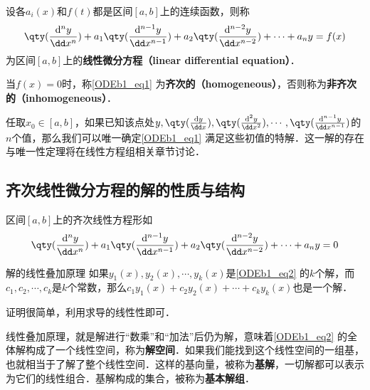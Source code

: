 

\begin{definition}{}
设各$a_i(x)$和$f(t)$都是区间$[a, b]$上的连续函数，则称
\begin{equation}\label{ODEb1_eq1}
\qty(\frac{\mathrm{d}^n y}{\dd x^n})+a_1\qty(\frac{\mathrm{d}^{n-1} y}{\dd x^{n-1}})+a_2\qty(\frac{\mathrm{d}^{n-2} y}{\dd x^{n-2}})+\cdots+a_ny=f(x)
\end{equation}
为区间$[a, b]$上的\textbf{线性微分方程（linear differential equation）}．

当$f(x)=0$时，称\autoref{ODEb1_eq1} 为\textbf{齐次的（homogeneous）}，否则称为\textbf{非齐次的（inhomogeneous）}．
\end{definition}

任取$x_0\in[a, b]$，如果已知该点处$y, \qty(\frac{\mathrm{d} y}{\dd x}), \qty(\frac{\mathrm{d}^{2} y}{\dd x^{2}}), \cdots, \qty(\frac{\mathrm{d}^{n-1} y}{\dd x^{n-1}})$的$n$个值，那么我们可以唯一确定\autoref{ODEb1_eq1} 满足这些初值的特解．这一解的存在与唯一性定理将在线性方程组相关章节讨论．


\subsection{齐次线性微分方程的解的性质与结构}

区间$[a, b]$上的齐次线性方程形如
\begin{equation}\label{ODEb1_eq2}
\qty(\frac{\mathrm{d}^n y}{\dd x^n})+a_1\qty(\frac{\mathrm{d}^{n-1} y}{\dd x^{n-1}})+a_2\qty(\frac{\mathrm{d}^{n-2} y}{\dd x^{n-2}})+\cdots+a_ny=0
\end{equation}

\begin{theorem}{解的线性叠加原理}
如果$y_1(x), y_2(x), \cdots, y_k(x)$是\autoref{ODEb1_eq2} 的$k$个解，而$c_1, c_2, \cdots, c_k$是$k$个常数，那么$c_1y_1(x)+c_2y_2(x)+\cdots+c_ky_k(x)$也是一个解．
\end{theorem}

证明很简单，利用求导的线性性即可．

线性叠加原理，就是解进行“数乘”和“加法”后仍为解，意味着\autoref{ODEb1_eq2} 的全体解构成了一个线性空间，称为\textbf{解空间}．如果我们能找到这个线性空间的一组基，也就相当于了解了整个线性空间．这样的基向量，被称为\textbf{基解}，一切解都可以表示为它们的线性组合．基解构成的集合，被称为\textbf{基本解组}．

